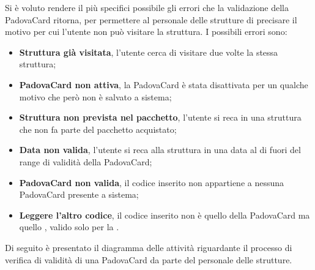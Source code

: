 Si è voluto rendere il più specifici possibile gli errori che la validazione della PadovaCard ritorna, per permettere al personale delle strutture di precisare il motivo per cui l'utente non può visitare la struttura. I possibili errori sono:
\begin{itemize}
\item \textbf{Struttura già visitata}, l'utente cerca di visitare due volte la stessa struttura;
\item \textbf{PadovaCard non attiva}, la PadovaCard è stata disattivata per un qualche motivo che però non è salvato a sistema;
\item \textbf{Struttura non prevista nel pacchetto}, l'utente si reca in una struttura che non fa parte del pacchetto acquistato;
\item \textbf{Data non valida}, l'utente si reca alla struttura in una data al di fuori del range di validità della PadovaCard;
\item \textbf{PadovaCard non valida}, il codice inserito non appartiene a nessuna PadovaCard presente a sistema;
\item \textbf{Leggere l'altro codice}, il codice inserito non è quello della PadovaCard ma quello \tlite, valido solo per la \cappella.
\end{itemize}

Di seguito è presentato il diagramma delle attività riguardante il processo di verifica di validità di una PadovaCard da parte del personale delle strutture.


